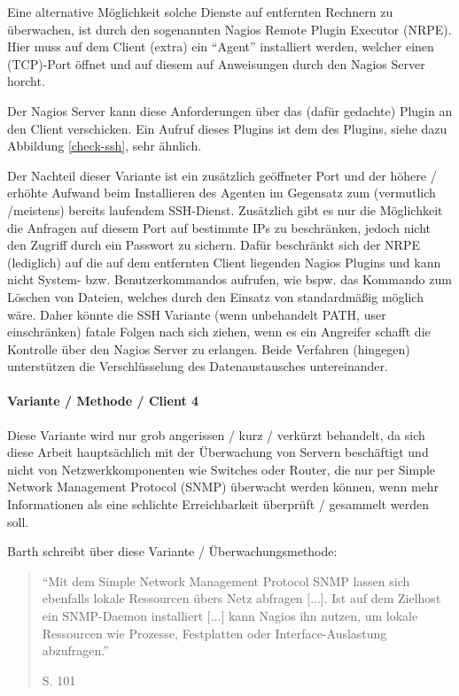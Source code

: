 Eine alternative Möglichkeit solche Dienste auf entfernten Rechnern zu überwachen, ist durch den sogenannten Nagios Remote Plugin Executor (\gls{NRPE}).
Hier muss auf dem Client (extra) ein "`Agent"' installiert werden, welcher einen (TCP)-Port öffnet und auf diesem auf Anweisungen durch den Nagios Server horcht.

Der Nagios Server kann diese Anforderungen über das (dafür gedachte) Plugin  an den Client verschicken.
Ein Aufruf dieses Plugins ist dem des  Plugins, siehe dazu Abbildung \ref{check-ssh}, sehr ähnlich.

Der Nachteil dieser Variante ist ein zusätzlich geöffneter Port und der höhere / erhöhte Aufwand beim Installieren des Agenten im Gegensatz zum (vermutlich /meistens) bereits laufendem SSH-Dienst.
Zusätzlich gibt es nur die Möglichkeit die Anfragen auf diesem Port auf bestimmte IPs zu beschränken, jedoch nicht den Zugriff durch ein Passwort zu sichern.
Dafür beschränkt sich der NRPE (lediglich) auf die auf dem entfernten Client liegenden Nagios Plugins und kann nicht System- bzw. Benutzerkommandos aufrufen, wie bspw. das  Kommando zum Löschen von Dateien, welches durch den Einsatz von  standardmäßig möglich wäre.
Daher könnte die SSH Variante (wenn unbehandelt PATH, user einschränken) fatale Folgen nach sich ziehen, wenn es ein Angreifer schafft die Kontrolle über den Nagios Server zu erlangen.
Beide Verfahren (hingegen) unterstützen die Verschlüsselung des Datenaustausches untereinander.

\paragraph{Variante / Methode / Client 4}
Diese Variante wird nur grob angerissen / kurz / verkürzt behandelt, da sich diese Arbeit hauptsächlich mit der Überwachung von Servern beschäftigt und nicht von Netzwerkkomponenten wie Switches oder Router, die nur per Simple Network Management Protocol (\gls{SNMP}) überwacht werden können, wenn mehr Informationen als eine schlichte Erreichbarkeit überprüft / gesammelt werden soll.

Barth schreibt über diese Variante / Überwachungsmethode:
\begin{quote}"`Mit dem Simple Network Management Protocol SNMP lassen sich ebenfalls lokale Ressourcen übers Netz abfragen [...]. Ist auf dem Zielhost ein SNMP-Daemon installiert [...] kann Nagios ihn nutzen, um lokale Ressourcen wie Prozesse, Festplatten oder Interface-Auslastung abzufragen."' \begin{flushright}\cite{Barth08} S. 101\end{flushright}\end{quote} 

